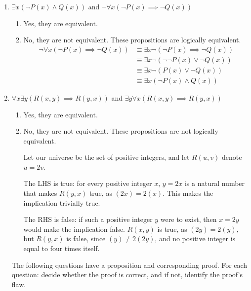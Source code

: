 \documentclass[11pt, preview]{standalone} %
\begin{document}
\begin{enumerate}
\item
$\exists x (\neg P(x) \land Q(x))$ and $\neg \forall x (\neg P(x) \implies \neg Q(x))$
\begin{Choices}
  \begin{enumerate}
    \TrueChoice\item Yes, they are equivalent.
    \FalseChoice\item No, they are not equivalent.
    \Solution These propositions are logically equivalent.
    \begin{align*}
      \neg \forall x (\neg P(x) \implies \neg Q(x)) &\equiv \exists x \neg (\neg P(x) \implies \neg Q(x)) \\
      &\equiv \exists x \neg (\neg \neg P(x) \lor \neg Q(x)) \\
      &\equiv \exists x \neg (P(x) \lor \neg Q(x)) \\
      &\equiv \exists x (\neg P(x) \land Q(x))
    \end{align*}
  \end{enumerate}
\end{Choices}

\item
$\forall x \exists y (R(x, y) \implies R(y, x))$ and $\exists y \forall x (R(x, y) \implies R(y, x))$
\begin{Choices}
  \begin{enumerate}
    \FalseChoice\item Yes, they are equivalent.
    \TrueChoice\item No, they are not equivalent.
    \Solution These propositions are not logically equivalent.

    Let our universe be the set of positive integers, and let $R(u, v)$ denote $u = 2v$.

    The LHS is true: for every positive integer $x$, $y = 2x$ is a natural number that makes $R(y, x)$ true, as $(2x) = 2(x)$. This makes the implication trivially true.

    The RHS is false: if such a positive integer $y$ were to exist, then $x=2y$ would make the implication false. $R(x, y)$ is true, as $(2y) = 2(y)$, but $R(y, x)$ is false, since $(y) \ne 2(2y)$, and no positive integer is equal to four times itself.
  \end{enumerate}
\end{Choices}

The following questions have a proposition and corresponding proof. For each question: decide whether the proof is correct, and if not, identify the proof's flaw.


\end{enumerate}
\end{document}
